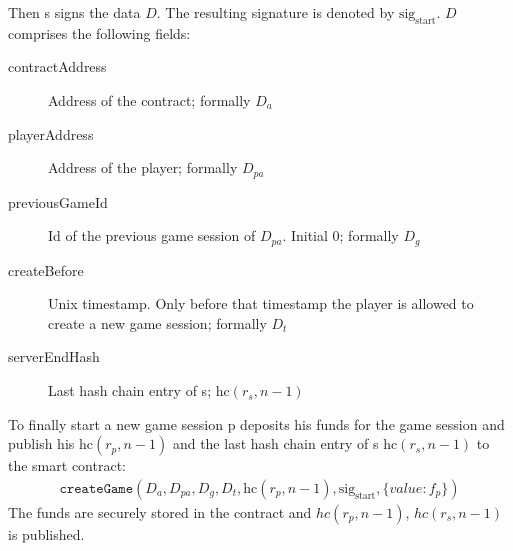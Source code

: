 \documentclass[oneside]{amsart}
\begin{document}
\begin{multicols}{2}
Then \Gls{s} signs the data $D$. The resulting signature is denoted by $\text{sig}_{\text{start}}$.
$D$ comprises the following fields:
\begin{description}
    \item[contractAddress] Address of the contract; formally $D_a$
    \item[playerAddress] Address of the player; formally $D_{pa}$
    \item[previousGameId] Id of the previous game session of $D_{pa}$. Initial 0; formally $D_g$
    \item[createBefore] Unix timestamp. Only before that timestamp the player is allowed to create a new game session; formally $D_t$
    \item[serverEndHash] Last hash chain entry of \gls{s}; $\text{hc}(r_s, n - 1)$
\end{description}

To finally start a new game session \gls{p} deposits his funds for the game session and publish his $\text{hc}(r_p, n - 1)$
and the last hash chain entry of \gls{s} $\text{hc}(r_s, n - 1)$ to the smart contract:
\begin{align}
    \texttt{createGame}(D_a, D_{pa}, D_g, D_t, \text{hc}(r_p, n - 1), \text{sig}_{\text{start}}, \lbrace value: f_p \rbrace)
\end{align}
The funds are securely stored in the contract and $hc(r_p, n - 1)$, $hc(r_s, n - 1)$  is published.


\end{multicols}
\end{document}
